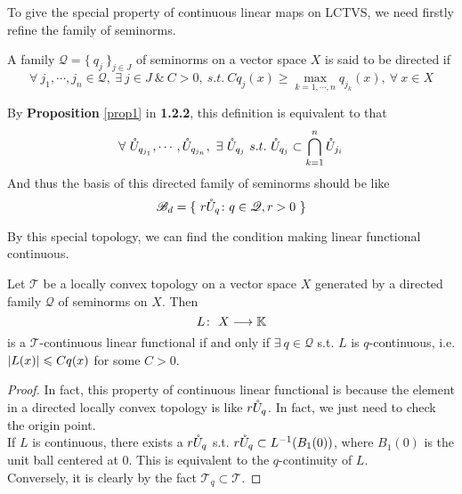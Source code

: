 \documentclass[a4paper,11pt]{report}
\begin{document}
To give the special property of continuous linear maps on LCTVS, we need firstly refine the family of seminorms.
\begin{defn}
	A family $\mathscr{Q} = \{~q_j~\}_{j \in J}$ of seminorms on a vector space $X$ is said to be directed if
	\begin{equation*}
		\forall ~ j_1, \cdots, j_n \in \mathscr{Q},~ \exists ~ j \in J ~\&~ C>0,~ s.t.~ C q_j(x) \geqslant \max_{k=1,\cdots,n} q_{j_k}(x),~ \forall~ x \in X
	\end{equation*}
\end{defn}
\begin{rem}
	By \textbf{Proposition} \ref{prop1} in \textbf{1.2.2}, this definition is equivalent to that
	\begin{equation*}
		\forall~ \mathring{U}_{q_{j_1}}, \cdots, \mathring{U}_{q_{j_n}},~ \exists~ \mathring{U}_{q_j} ~s.t.~ \mathring{U}_{q_j} \subset \bigcap_{k=1}^{n} \mathring{U}_{j_i}
	\end{equation*}
	And thus the basis of this directed family of seminorms should be like
	\begin{equation*}
		\mathscr{B}_d = \{~ r\mathring{U}_q \colon q \in \mathscr{Q},r>0 ~\}
	\end{equation*}
\end{rem}

By this special topology, we can find the condition making linear functional continuous.

\begin{prop}
	Let $\mathscr{T}$ be a locally convex topology on a vector space $X$ generated by a directed family $\mathscr{Q}$ of seminorms on $X$. Then
	\begin{equation*}
		L \colon ~ X \longrightarrow \mathbb{K}
	\end{equation*}
	is a $\mathscr{T}$-continuous linear functional if and only if $\exists ~ q \in \mathscr{Q}$ s.t. $L$ is $q$-continuous, i.e. $\left\lvert L(x)\right\lvert \leqslant Cq(x)$ for some $C > 0$.
\end{prop}
\begin{proof}
	In fact, this property of continuous linear functional is because the element in a directed locally convex topology is like $r\mathring{U}_q$. In fact, we just need to check the origin point.\\
	If $L$ is continuous, there exists a $r\mathring{U}_q$ s.t. $r\mathring{U}_q \subset L^{-1}(B_1(0))$, where $B_1(0)$ is the unit ball centered at $0$. This is equivalent to the $q$-continuity of $L$.\\
	Conversely, it is clearly by the fact $\mathscr{T}_q \subset \mathscr{T}$.
\end{proof}
\end{document}
